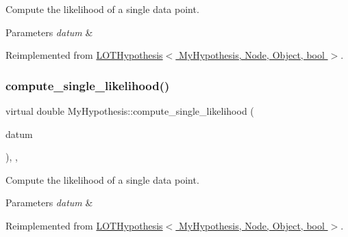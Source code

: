 Compute the likelihood of a single data point. 


\begin{DoxyParams}{Parameters}
{\em datum} & \\
\hline
\end{DoxyParams}


Reimplemented from \hyperlink{class_l_o_t_hypothesis_a835f1aafdd4bc4748c343edb80517956}{L\+O\+T\+Hypothesis$<$ My\+Hypothesis, Node, Object, bool $>$}.

\mbox{\label{class_my_hypothesis_af60601a7db23e9ed8d1e3343af506733}} 
\subsubsection{\texorpdfstring{compute\+\_\+single\+\_\+likelihood()}{compute\_single\_likelihood()}\hspace{0.1cm}{\footnotesize\ttfamily [2/2]}}
{\footnotesize\ttfamily virtual double My\+Hypothesis\+::compute\+\_\+single\+\_\+likelihood (\begin{DoxyParamCaption}\item[{const \hyperlink{class_bayesable_a7c93a2eeab708378eb321745908718d4}{t\+\_\+datum} \&}]{datum }\end{DoxyParamCaption})\hspace{0.3cm}{\ttfamily [inline]}, {\ttfamily [override]}, {\ttfamily [virtual]}}



Compute the likelihood of a single data point. 


\begin{DoxyParams}{Parameters}
{\em datum} & \\
\hline
\end{DoxyParams}


Reimplemented from \hyperlink{class_l_o_t_hypothesis_a835f1aafdd4bc4748c343edb80517956}{L\+O\+T\+Hypothesis$<$ My\+Hypothesis, Node, Object, bool $>$}.

\mbox{\label{class_my_hypothesis_a3de47a545e8824bb8c63181965c62a01}} 
